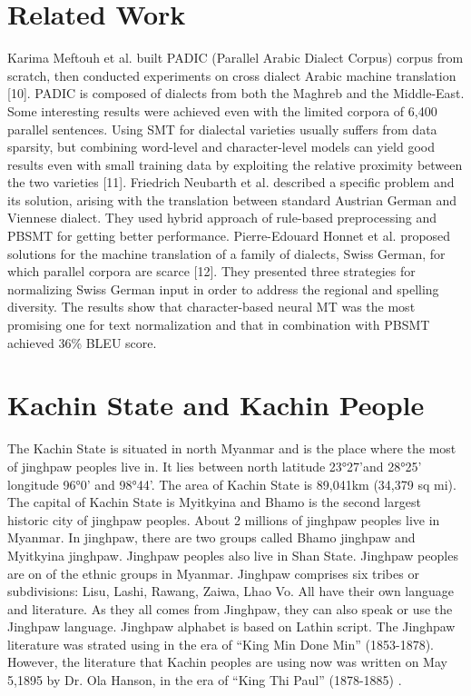 \documentclass[conference]{IEEEtran}
\begin{document}
\section{Related Work}
Karima Meftouh et al. built PADIC (Parallel Arabic Dialect Corpus) corpus from scratch, then conducted experiments on cross dialect Arabic machine translation [10].  PADIC is composed of dialects from both the Maghreb and the Middle-East. Some interesting results were achieved even with the limited corpora of 6,400 parallel sentences.
	Using SMT for dialectal varieties usually suffers from data sparsity, but combining word-level and character-level models can yield good results even with small training data by exploiting the relative proximity between the two varieties [11]. Friedrich Neubarth et al. described a specific problem and its solution, arising with the translation between standard Austrian German and Viennese dialect. They used hybrid approach of rule-based preprocessing and PBSMT for getting better performance.
	Pierre-Edouard Honnet et al. proposed solutions for the machine translation of a family of dialects, Swiss German, for which parallel corpora are scarce [12]. They presented three strategies for normalizing Swiss German input in order to address the regional and spelling diversity. The results show that character-based neural MT was the most promising one for text normalization and that in combination with PBSMT achieved 36\% BLEU score.

\section{Kachin State and Kachin People}
The Kachin State is situated in north Myanmar and is the place where the most of jinghpaw peoples live in. It lies between north latitude 23°27'and 28°25' longitude 96°0' and 98°44'. The area of Kachin State is 89,041km (34,379 sq mi). The capital of Kachin State is Myitkyina and Bhamo is the second largest historic city of jinghpaw peoples. About 2 millions of jinghpaw peoples live in Myanmar. In jinghpaw, there are two groups called Bhamo jinghpaw and Myitkyina jinghpaw. Jinghpaw peoples also live in Shan State. Jinghpaw peoples are on of  the ethnic groups in Myanmar. Jinghpaw comprises six tribes or subdivisions: Lisu, Lashi, Rawang, Zaiwa, Lhao Vo. All have their own language and literature. As they all comes from Jinghpaw, they can also speak or use the Jinghpaw language. Jinghpaw alphabet is based on Lathin script. The Jinghpaw literature was strated using in the era of “King Min Done Min” (1853-1878). However, the literature that Kachin peoples are using now was  written on May 5,1895 by Dr. Ola Hanson, in the era of “King Thi Paul” (1878-1885) .
\end{document}
